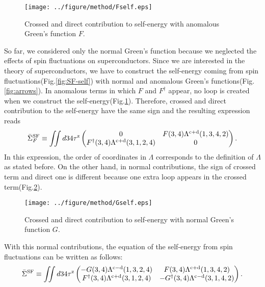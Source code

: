 \begin{figure}[h] %
	\centering
	\texttt{[image: ../figure/method/Fself.eps]}
	\caption{Crossed and direct contribution to self-energy with anomalous Green's function $F$.}
	\label{fig:Fself}
\end{figure}
So far, we considered only the normal Green's function because
we neglected the effects of spin fluctuations on superconductors.
Since we are interested in the theory of superconductors, we have to 
construct the self-energy coming from spin fluctuations(Fig.\ref{fig:SF-self})
with normal and anomalous Green's functions(Fig.\ref{fig:arrows}).
In anomalous terms in which $F$ and $F^\dag$ appear, no loop is created
when we construct the self-energy(Fig.\ref{fig:Fself}).
Therefore, crossed and direct contribution to the self-energy have the 
same sign and the resulting expression reads
%
\begin{equation}
	\bar{\Sigma}^{\rm SF}_F \equiv \iint d34 \tau^{\rm z}
	\begin{pmatrix}
		0 & F(3,4)\Lambda^{\rm c + \rm d}(1,3,4,2) \\
		F^\dag(3,4)\Lambda^{\rm c + \rm d}(3,1,2,4) &0
	\end{pmatrix}.
	\label{eq:Fself}
\end{equation}
%
In this expression, the order of coordinates in $\Lambda$ corresponds to the definition of $\Lambda$ as stated before.
On the other hand, in normal contributions, the sign of crossed term and
direct one is different because one extra loop appears in the crossed term(Fig.\ref{fig:Gself}).
%
\begin{figure}[h] %
	\centering
	\texttt{[image: ../figure/method/Gself.eps]}
	\caption{Crossed and direct contribution to self-energy with normal Green's function $G$.}
	\label{fig:Gself}
\end{figure}
%
With this normal contributions, the equation of the self-energy from spin fluctuations can be written as follows:
%
\begin{equation}
	\bar{\Sigma}^{\rm SF} \equiv \iint d34 \tau^{\rm z}
	\begin{pmatrix}
		-G(3,4)\Lambda^{\rm c - \rm d}(1,3,2,4) & F(3,4)\Lambda^{\rm c + \rm d}(1,3,4,2) \\
		F^\dag(3,4)\Lambda^{\rm c + \rm d}(3,1,2,4) & -G^\dag(3,4)\Lambda^{\rm c - \rm d}(3,1,4,2)
	\end{pmatrix}.
	\label{eq:GFself}
\end{equation}
%

